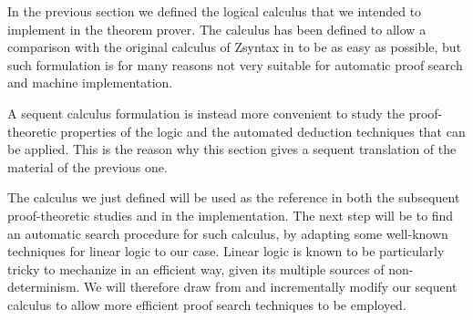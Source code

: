 In the previous section we defined the logical calculus that we intended to
implement in the theorem prover. The calculus has been defined to allow a
comparison with the original calculus of Zsyntax in \cite{adding-logic} to be as
easy as possible, but such formulation is for many reasons not very suitable for
automatic proof search and machine implementation.

A sequent calculus formulation is instead more convenient to study the
proof-theoretic properties of the logic and the automated deduction techniques
that can be applied. This is the reason why this section gives a sequent
translation of the material of the previous one.

The calculus we just defined will be used as the reference in both the
subsequent proof-theoretic studies and in the implementation. The next step will
be to find an automatic search procedure for such calculus, by adapting some
well-known techniques for linear logic to our case.  Linear logic is known to be
particularly tricky to mechanize in an efficient way, given its multiple sources
of non-determinism. We will therefore draw from \cite{haudhuri-thesis} and
incrementally modify our sequent calculus to allow more efficient proof search
techniques to be employed.

